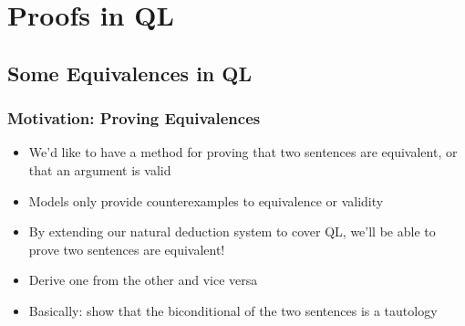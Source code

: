 ﻿%

\setcounter{section}{9}


\section{Proofs in QL}

\begin{frame}

\scriptsize{\tableofcontents}

\end{frame}

\subsection{Some Equivalences in QL}

\begin{frame}
\frametitle{Motivation: Proving Equivalences}

\begin{itemize}[<+->]

\item We'd like to have a method for proving that two sentences are equivalent, or that an argument is valid 

\item Models only provide counterexamples to equivalence or validity

\item By extending our natural deduction system to cover QL, we'll be able to prove two sentences are equivalent! 

\bi

\item Derive one from the other and vice versa

\item Basically: show that the biconditional of the two sentences is a tautology 

\ei


\end{itemize}
\end{frame}

